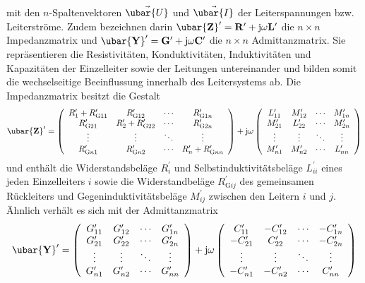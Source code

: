 mit den $n$-Spaltenvektoren $\vec{\ubar{U}}$ und $\vec{\ubar{I}}$ der Leiterspannungen bzw. Leiterströme. Zudem bezeichnen darin $\ubar{\mathbf{Z}}^{\prime}=\mathbf{R}^{\prime}+\mathrm{j} \omega \mathbf{L}^{\prime}$ die $n \times n$ Impedanzmatrix und $\ubar{\mathbf{Y}}^{\prime}=\mathbf{G}^{\prime}+\mathrm{j} \omega \mathbf{C}^{\prime}$ die $n \times n$ Admittanzmatrix. Sie repräsentieren die Resistivitäten, Konduktivitäten, Induktivitäten und Kapazitäten der Einzelleiter sowie der Leitungen untereinander und bilden somit die wechselseitige Beeinflussung innerhalb des Leitersystems ab. Die Impedanzmatrix besitzt die Gestalt
\begin{equation}
	\ubar{\mathbf{Z}}^{\prime}=\left(\begin{array}{cccc}
		R_{1}^{\prime}+R_{\mathrm{G} 11}^{\prime} & R_{\mathrm{G} 12}^{\prime} & \cdots & R_{\mathrm{G} 1 n}^{\prime}  \\
		R_{\mathrm{G} 21}^{\prime} & R_{2}^{\prime}+R_{\mathrm{G} 22}^{\prime} & \cdots & R_{\mathrm{G} 2 n}^{\prime} \\
		\vdots & \vdots & \ddots & \vdots \\
		R_{\mathrm{G} n 1}^{\prime} & R_{\mathrm{G} n 2}^{\prime} & \cdots & R_{n}^{\prime}+R_{\mathrm{G} n n}^{\prime}
	\end{array}\right)+\mathrm{j} \omega\left(\begin{array}{cccc}
		L_{11}^{\prime} & M_{12}^{\prime} & \cdots & M_{1 n}^{\prime} \\
		M_{21}^{\prime} & L_{22}^{\prime} & \cdots & M_{2 n}^{\prime} \\
		\vdots & \vdots & \ddots & \vdots \\
		M_{n 1}^{\prime} & M_{n 2}^{\prime} & \cdots & L_{n n}^{\prime}
	\end{array}\right)
\end{equation}
und enthält die Widerstandsbeläge $R_{i}^{\prime}$ und Selbstinduktivitätsbeläge $L_{i i}^{\prime}$ eines jeden Einzelleiters $i$ sowie die Widerstandbeläge $R_{\mathrm{G} i j}^{\prime}$ des gemeinsamen Rückleiters und Gegeninduktivitätsbeläge $M_{i j}^{\prime}$ zwischen den Leitern $i$ und $j$. Ähnlich verhält es sich mit der Admittanzmatrix
\begin{equation}
	\ubar{\mathbf{Y}}^{\prime}=\left(\begin{array}{cccc}
		G_{11}^{\prime} & G_{12}^{\prime} & \cdots & G_{1 n}^{\prime}  \\
		G_{21}^{\prime} & G_{22}^{\prime} & \cdots & G_{2 n}^{\prime} \\
		\vdots & \vdots & \ddots & \vdots \\
		G_{n 1}^{\prime} & G_{n 2}^{\prime} & \cdots & G_{n n}^{\prime}
	\end{array}\right)+\mathrm{j} \omega\left(\begin{array}{cccc}
		C_{11}^{\prime} & -C_{12}^{\prime} & \cdots & -C_{1 n}^{\prime} \\
		-C_{21}^{\prime} & C_{22}^{\prime} & \cdots & -C_{2 n}^{\prime} \\
		\vdots & \vdots & \ddots & \vdots \\
		-C_{n 1}^{\prime} & -C_{n 2}^{\prime} & \cdots & C_{n n}^{\prime}
	\end{array}\right)
\end{equation}

